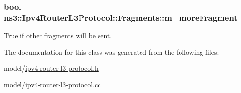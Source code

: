 \hypertarget{classns3_1_1Ipv4RouterL3Protocol_1_1Fragments_a98acf0bddf84056bce2281fe62669cd1}{
\subsubsection[{m\-\_\-more\-Fragment}]{\setlength{\rightskip}{0pt plus 5cm}bool ns3\-::\-Ipv4\-Router\-L3\-Protocol\-::\-Fragments\-::m\-\_\-more\-Fragment\hspace{0.3cm}{\ttfamily [private]}}}\label{classns3_1_1Ipv4RouterL3Protocol_1_1Fragments_a98acf0bddf84056bce2281fe62669cd1}


True if other fragments will be sent. 



The documentation for this class was generated from the following files\-:\begin{DoxyCompactItemize}
\item 
model/\hyperlink{ipv4-router-l3-protocol_8h}{ipv4-\/router-\/l3-\/protocol.\-h}\item 
model/\hyperlink{ipv4-router-l3-protocol_8cc}{ipv4-\/router-\/l3-\/protocol.\-cc}\end{DoxyCompactItemize}
